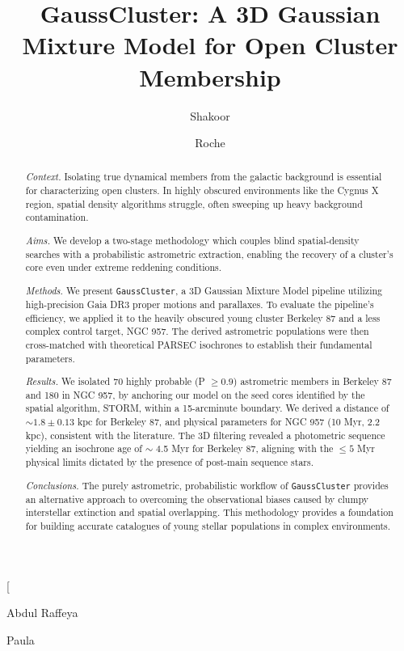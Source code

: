 \documentclass{CU_IOPStyle_PXT999}
\begin{document}
\twocolumn[
\title{GaussCluster: A 3D Gaussian Mixture Model for Open Cluster Membership}

\author{Shakoor}{Abdul Raffey}{a}
\author{Roche}{Paul}{a}


\maketitle

\begin{abstract}
\textit{Context.} Isolating true dynamical members from the galactic background is essential for characterizing open clusters. In highly obscured environments like the Cygnus X region, spatial density algorithms struggle, often sweeping up heavy background contamination.

\textit{Aims.} We develop a two-stage methodology which couples blind spatial-density searches with a probabilistic astrometric extraction, enabling the recovery of a cluster's core even under extreme reddening conditions.

\textit{Methods.} We present \texttt{GaussCluster}, a 3D Gaussian Mixture Model pipeline utilizing high-precision Gaia DR3 proper motions and parallaxes. To evaluate the pipeline's efficiency, we applied it to the heavily obscured young cluster Berkeley 87 and a less complex control target, NGC 957. The derived astrometric populations were then cross-matched with theoretical PARSEC isochrones to establish their fundamental parameters.

\textit{Results.} We isolated 70 highly probable (P $\ge 0.9$) astrometric members in Berkeley 87 and 180 in NGC 957, by anchoring our model on the seed cores identified by the spatial algorithm, STORM, within a 15-arcminute boundary. We derived a distance of $\sim 1.8 \pm 0.13$ kpc for Berkeley 87, and physical parameters for NGC 957 (10 Myr, 2.2 kpc), consistent with the literature. The 3D filtering revealed a photometric sequence yielding an isochrone age of $\sim$ 4.5 Myr for Berkeley 87, aligning with the $\le 5$ Myr physical limits dictated by the presence of post-main sequence stars.

\textit{Conclusions.} The purely astrometric, probabilistic workflow of \texttt{GaussCluster} provides an alternative approach to overcoming the observational biases caused by clumpy interstellar extinction and spatial overlapping. This methodology provides a foundation for building accurate catalogues of young stellar populations in complex environments.
\end{abstract}
\end{document}
